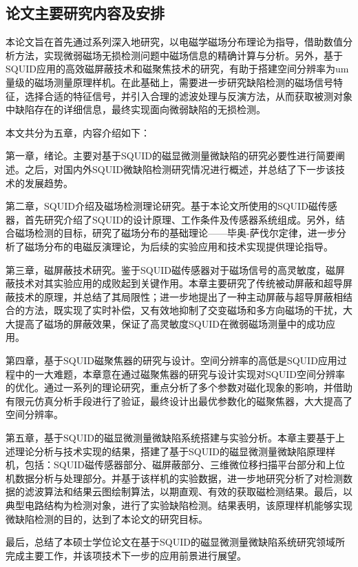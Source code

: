 \documentclass[a4paper,12pt，twoside]{ctexart}
\begin{document}
	\subsection{论文主要研究内容及安排}
	本论文旨在首先通过系列深入地研究，以电磁学磁场分布理论为指导，借助数值分析方法，实现微弱磁场无损检测问题中磁场信息的精确计算与分析。另外，基于SQUID应用的高效磁屏蔽技术和磁聚焦技术的研究，有助于搭建空间分辨率为um量级的磁场测量原理样机。在此基础上，需要进一步研究缺陷检测的磁场信号特征，选择合适的特征信号，并引入合理的滤波处理与反演方法，从而获取被测对象中缺陷存在的详细信息，最终实现面向微弱缺陷的无损检测。\par
	本文共分为五章，内容介绍如下：\par
	第一章，绪论。主要对基于SQUID的磁显微测量微缺陷的研究必要性进行简要阐述。之后，对国内外SQUID微缺陷检测研究情况进行概述，并总结了下一步该技术的发展趋势。\par
	第二章，SQUID介绍及磁场检测理论研究。基于本论文所使用的SQUID磁传感器，首先研究介绍了SQUID的设计原理、工作条件及传感器系统组成。另外，结合磁场检测的目标，研究了磁场分布的基础理论——毕奥-萨伐尔定律，进一步分析了磁场分布的电磁反演理论，为后续的实验应用和技术实现提供理论指导。\par
	第三章，磁屏蔽技术研究。鉴于SQUID磁传感器对于磁场信号的高灵敏度，磁屏蔽技术对其实验应用的成败起到关键作用。本章主要研究了传统被动屏蔽和超导屏蔽技术的原理，并总结了其局限性；进一步地提出了一种主动屏蔽与超导屏蔽相结合的方法，既实现了实时补偿，又有效地抑制了交变磁场和多方向磁场的干扰，大大提高了磁场的屏蔽效果，保证了高灵敏度SQUID在微弱磁场测量中的成功应用。 \par
	第四章，基于SQUID磁聚焦器的研究与设计。空间分辨率的高低是SQUID应用过程中的一大难题，本章意在通过磁聚焦器的研究与设计实现对SQUID空间分辨率的优化。通过一系列的理论研究，重点分析了多个参数对磁化现象的影响，并借助有限元仿真分析手段进行了验证，最终设计出最优参数化的磁聚焦器，大大提高了空间分辨率。\par
	第五章，基于SQUID的磁显微测量微缺陷系统搭建与实验分析。本章主要基于上述理论分析与技术实现的结果，搭建了基于SQUID的磁显微测量微缺陷原理样机，包括：SQUID磁传感器部分、磁屏蔽部分、三维微位移扫描平台部分和上位机数据分析与处理部分。并基于该样机的实验数据，进一步地研究分析了对检测数据的滤波算法和结果云图绘制算法，以期直观、有效的获取磁检测结果。最后，以典型电路结构为检测对象，进行了实验缺陷检测。结果表明，该原理样机能够实现微缺陷检测的目的，达到了本论文的研究目标。\par
	最后，总结了本硕士学位论文在基于SQUID的磁显微测量微缺陷系统研究领域所完成主要工作，并该项技术下一步的应用前景进行展望。\par
	
\end{document}
